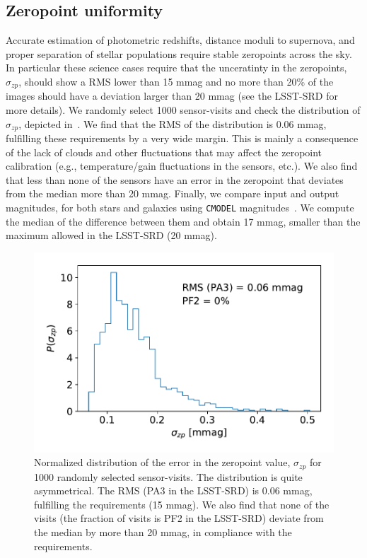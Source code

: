 \documentclass[a4paper,fleqn,usenatbib]{mnras}
\begin{document}
\subsection{Zeropoint uniformity}
\label{sssec:zeropoints}
Accurate estimation of photometric redshifts, distance moduli to supernova, and proper separation of stellar populations require stable zeropoints across the sky. In particular these science cases require that the unceratinty in the zeropoints, $\sigma_{zp}$, should show a RMS lower than 15 mmag and no more than 20\% of the images should have a deviation larger than 20 mmag (see the LSST-SRD for more details). We randomly select 1000 sensor-visits and check the distribution of $\sigma_{zp}$, depicted in~. We find that the RMS of the distribution is 0.06 mmag, fulfilling these requirements by a very wide margin. This is mainly a consequence of the lack of clouds and other fluctuations that may affect the zeropoint calibration (e.g., temperature/gain fluctuations in the sensors, etc.). We also find that less than none of the sensors have an error in the zeropoint that deviates from the median more than 20 mmag. Finally, we compare input and output magnitudes, for both stars and galaxies using \texttt{CMODEL} magnitudes~\citep{2018PASJ...70S...5B}. We compute the median of the difference between them and obtain 17 mmag, smaller than the maximum allowed in the LSST-SRD (20 mmag). 
\begin{figure}
\centering
\includegraphics[width=0.85\columnwidth]{PA234.pdf}
\caption{Normalized distribution of the error in the zeropoint value, $\sigma_{zp}$ for 1000 randomly selected sensor-visits. The distribution is quite asymmetrical. The RMS (PA3 in the LSST-SRD) is 0.06 mmag, fulfilling the requirements (15 mmag). We also find that none of the visits (the fraction of visits is PF2 in the LSST-SRD) deviate from the median by more than 20 mmag, in compliance with the requirements.}
\label{fig:PA34}
\end{figure}
\end{document}
